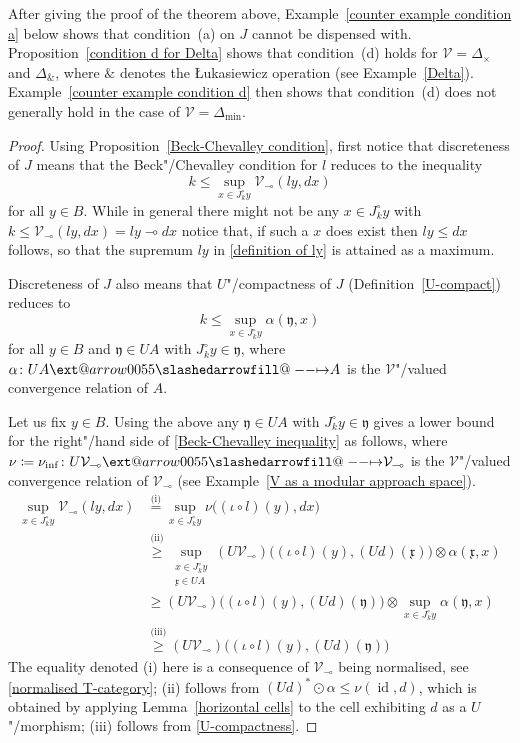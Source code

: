 \documentclass[preprint, a4paper]{elsarticle}
\makeatletter
\def\slashedarrowfill@#1#2#3#4#5{%
  $\m@th\thickmuskip0mu\medmuskip\thickmuskip\thinmuskip\thickmuskip
   \relax#5#1\mkern-7mu%
   \cleaders\hbox{$#5\mkern-2mu#2\mkern-2mu$}\hfill
   \mathclap{#3}\mathclap{#2}%
   \cleaders\hbox{$#5\mkern-2mu#2\mkern-2mu$}\hfill
   \mkern-7mu#4$%
}
\def\rightslashedarrowfill@{%
  \slashedarrowfill@\relbar\relbar\mapstochar\rightarrow}
\newcommand\xslashedrightarrow[2][]{%
  \ext@arrow 0055{\rightslashedarrowfill@}{#1}{#2}}
\def\slashedrightarrow{\xslashedrightarrow{}}
\newcommand{\dashcirc}{\multimap}
\theoremstyle{definition}
\theoremstyle{remark}
\providecommand{\defref}[1]{Definition~\ref{#1}}
\providecommand{\exref}[1]{Example~\ref{#1}}
\providecommand{\lemref}[1]{Lemma~\ref{#1}}
\providecommand{\propref}[1]{Proposition~\ref{#1}}
\providecommand{\dfn}{\coloneqq}
\providecommand{\of}{\circ}
\providecommand{\tens}{\otimes}
\providecommand{\mf}[1]{\mathfrak{#1}}
\providecommand{\bigpars}[1]{\bigl(#1\bigr)}
\providecommand{\rev}[1]{#1^\circ}
\newcommand{\tn}{\mathbin\&}
\providecommand{\hmap}[3]{#1\colon#2\slashedrightarrow#3}
\DeclareMathOperator{\id}{id}
\providecommand{\catvar}[1]{\mathcal{#1}}
\providecommand{\2}{\mathsf 2}
\providecommand{\V}{\catvar V}
\providecommand{\hc}{\odot}
\makeatother
\begin{document}
	After giving the proof of the theorem above, \exref{counter example condition a} below shows that condition~(a) on $J$ cannot be dispensed with. \propref{condition d for Delta} shows that condition~(d) holds for $\V = \Delta_\times$ and $\Delta_{\tn}$, where $\tn$ denotes the \L ukasiewicz operation (see \exref{Delta}). \exref{counter example condition d} then shows that condition~(d) does not generally hold in the case of $\V = \Delta_{\min}$.
	\begin{proof}
		Using \propref{Beck-Chevalley condition}, first notice that discreteness of $J$ means that the Beck"/Chevalley condition for $l$ reduces to the inequality
		\begin{equation}\label{Beck-Chevalley inequality}
			k \leq \sup_{x \in \rev J_ky} \V_{\dashcirc}(ly, dx)
		\end{equation}
		for all $y \in B$. While in general there might not be any $x \in \rev J_ky$ with $k \leq \V_{\dashcirc}(ly, dx) = ly \dashcirc dx$ notice that, if such a $x$ does exist then $ly \leq dx$ follows, so that the supremum $ly$ in \eqref{definition of ly} is attained as a maximum.
		
		Discreteness of $J$ also means that $U$"/compactness of $J$ (\defref{U-compact}) reduces to
		\begin{equation}\label{U-compactness}
			k \leq \sup_{x \in \rev J_ky} \alpha(\mf y, x)
		\end{equation}
		for all $y \in B$ and $\mf y \in UA$ with $\rev J_ky \in \mf y$, where $\hmap\alpha{UA}A$ is the $\V$"/valued convergence relation of $A$.
		
		Let us fix $y \in B$. Using the above any $\mf y \in UA$ with $\rev J_ky \in \mf y$ gives a lower bound for the right"/hand side of \eqref{Beck-Chevalley inequality} as follows, where $\hmap{\nu \dfn \nu_{\inf}}{U\V_{\dashcirc}}{\V_{\dashcirc}}$ is the $\V$"/valued convergence relation of $\V_{\dashcirc}$ (see \exref{V as a modular approach space}).
		\begin{align*}
			\sup_{x \in \rev J_k y} \V_{\dashcirc}(ly, dx) &\overset{\text{(i)}}= \sup_{x \in \rev J_k y} \nu\bigpars{(\iota \of l)(y), dx} \\
			&\overset{\text{(ii)}}\geq \sup_{\substack{x \in \rev J_k y \\ \mf x \in UA}} (U\V_{\dashcirc})\bigpars{(\iota \of l)(y), (Ud)(\mf x)} \tens \alpha(\mf x, x) \\
			&\geq (U\V_{\dashcirc})\bigpars{(\iota \of l)(y), (Ud)(\mf y)} \tens \sup_{x \in \rev J_ky} \alpha(\mf y, x) \\
			&\overset{\text{(iii)}}\geq (U\V_{\dashcirc})\bigpars{(\iota \of l)(y), (Ud)(\mf y)}
		\end{align*}
		 The equality denoted (i) here is a consequence of $\V_{\dashcirc}$ being normalised, see \eqref{normalised T-category}; (ii) follows from $(Ud)^* \hc \alpha \leq \nu(\id, d)$, which is obtained by applying \lemref{horizontal cells} to the cell exhibiting $d$ as a $U$"/morphism; (iii) follows from \eqref{U-compactness}.
		 

\end{proof}
\end{document}
